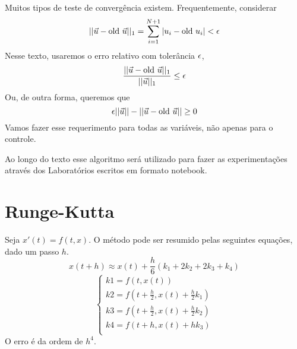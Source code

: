 Muitos tipos de teste de convergência existem. Frequentemente, considerar 
$$
||\vec{u} - \text{old }\vec{u}||_1 = \sum_{i=1}^{N+1} |u_i - \text{old }u_i| < \epsilon   
$$
Nesse texto, usaremos o erro relativo com tolerância $\epsilon$,
$$
\frac{||\vec{u} - \text{old }\vec{u}||_1}{||\vec{u}||_1} \le \epsilon 
$$
Ou, de outra forma, queremos que 
$$
\epsilon ||\vec{u}|| - ||\vec{u} - \text{old }\vec{u}|| \ge 0
$$
Vamos fazer esse requerimento para todas as variáveis, não apenas para o
controle. 

Ao longo do texto esse algoritmo será utilizado para fazer as experimentações
através dos Laboratórios escritos em formato notebook. 

\section{Runge-Kutta}

Seja $x'(t) = f(t,x)$. O método pode ser resumido pelas seguintes equações, dado um passo $h$. 
\begin{equation*}
    x(t + h) \approx x(t) + \frac{h}{6}(k_1 + 2k_2 + 2k_3 + k_4) 
\end{equation*}
\begin{equation*}
    \begin{cases}
    k1 = f(t,x(t)) \\
    k2 = f(t + \frac{h}{2},x(t) + \frac{h}{2}k_1) \\
    k3 = f(t + \frac{h}{2},x(t) + \frac{h}{2}k_2) \\
    k4 = f(t + h, x(t) + hk_3) \\
    \end{cases}
\end{equation*}
O erro é da ordem de $h^4$. 